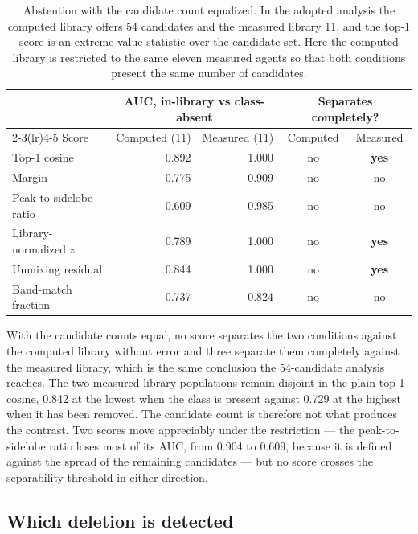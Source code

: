 \documentclass[11pt]{article}
\begin{document}
\begin{table}[htbp]
\centering
\caption{Abstention with the candidate count equalized. In the adopted analysis the
computed library offers 54 candidates and the measured library 11, and the top-1 score is
an extreme-value statistic over the candidate set. Here the computed library is restricted
to the same eleven measured agents so that both conditions present the same number of
candidates.}
\label{tab:si-abstsize}
\small
\begin{tabular}{lrrcc}
\toprule
 & \multicolumn{2}{c}{AUC, in-library vs class-absent} & \multicolumn{2}{c}{Separates completely?} \\
\cmidrule(lr){2-3}\cmidrule(lr){4-5}
Score & Computed (11) & Measured (11) & Computed & Measured \\
\midrule
Top-1 cosine & 0.892 & 1.000 & no & \textbf{yes} \\
Margin & 0.775 & 0.909 & no & no \\
Peak-to-sidelobe ratio & 0.609 & 0.985 & no & no \\
Library-normalized $z$ & 0.789 & 1.000 & no & \textbf{yes} \\
Unmixing residual & 0.844 & 1.000 & no & \textbf{yes} \\
Band-match fraction & 0.737 & 0.824 & no & no \\
\bottomrule
\end{tabular}

\begin{flushleft}\footnotesize With the candidate counts equal, no score separates the two
conditions against the computed library without error and three separate them completely against the
measured library, which is the same conclusion the 54-candidate analysis reaches. The two measured-library populations remain disjoint in the plain top-1 cosine, 0.842 at the lowest when the class is present against 0.729 at the highest when it has been removed. The candidate count
is therefore not what produces the contrast. Two scores move appreciably under the
restriction --- the peak-to-sidelobe ratio loses most of its AUC, from 0.904 to 0.609,
because it is defined against the spread of the remaining candidates --- but no score
crosses the separability threshold in either direction.\end{flushleft}
\end{table}

\subsection{Which deletion is detected}
\label{si:abstbycls}
\end{document}
